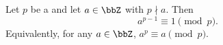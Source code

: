 \begin{theorem} \label{theorem:fermats_little_theorem}
    Let $p$ be a  and let $a \in \bbZ$ with $p \nmid a$. Then
    $$a^{p-1} \equiv 1 \pmod{p}.$$
    Equivalently, for any $a \in \bbZ$, $a^p \equiv a \pmod{p}$.
\end{theorem}
